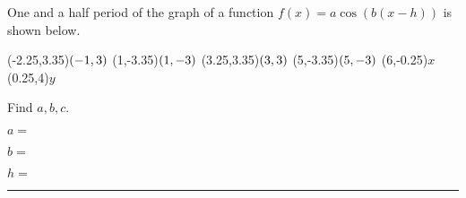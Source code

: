 \documentclass[11pt,answers]{exam}
\let\originalleft\left
\let\originalright\right
\renewcommand{\left}{\mathopen{}\mathclose\bgroup\originalleft}
\renewcommand{\right}{\aftergroup\egroup\originalright}
\begin{document}
\begin{questions}
\begin{parts}
\begin{multicols}{2}
 			\end{multicols}
 		\end{parts}	
 		
 		\question[3] One and a half period of the graph of a function $\displaystyle f(x)=a\cos(b(x-h))$ is shown below.
 	\begin{minipage}[t][][b]{0.5\textwidth}	
 		\begin{center}
 			
 			\begin{mfpic}[25]{-2}{6}{-3}{4}
 				\tlabel(-2.25,3.35){\tiny $\left(-1,3\right)$}
 				\tlabel[cc](1,-3.35){\tiny $\left(1,-3\right)$}
 				\tlabel(3.25,3.35){\tiny $\left(3,3\right)$}
 				\tlabel[cc](5,-3.35){\tiny $\left(5,-3\right)$}
 				\axes
 				\tlabel[cc](6,-0.25){\scriptsize $x$}
 				\tlabel[cc](0.25,4){\scriptsize $y$}
 				\tlpointsep{4pt}
 				\dotted {}
 				\dotted {}
 			\end{mfpic}
 			
 		\end{center}
 	\end{minipage}\begin{minipage}[t][][b]{0.5\textwidth}
 		Find $a,b,c$.
 		\bigskip
 		
 		$a=$ \dotfill
 		\bigskip
 		
 		$b=$ \dotfill
 		\bigskip
 		
 		$h=$ \dotfill
		\end{minipage}		
					\end{questions}
					\newpage
\par\medskip\hrule\medskip
\end{document}
